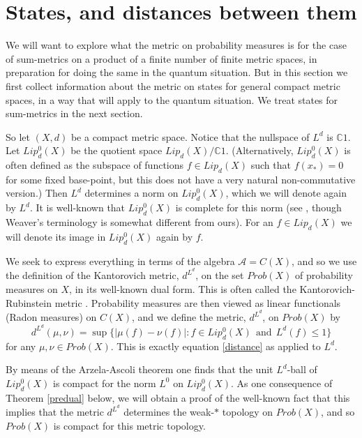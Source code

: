 \documentclass{amsart}[14pt]
\theoremstyle{definition}
\theoremstyle{remark}
\newcommand{\cA}{{\mathcal A}}
\newcommand{\bC}{{\mathbb C}}
\newcommand{\<}{\langle}
\renewcommand{\>}{\rangle}
\numberwithin{equation}{section}
\begin{document}
{ %

\section{States, and distances between them}
\label{trancos}

We will want to explore what the metric on
probability measures is for the
case of sum-metrics on a product of a finite number
of finite metric spaces, in preparation 
for doing the same in the quantum situation. 
But in this section we first collect information about the
metric on states for general compact metric spaces,
in a way that will apply to the quantum situation. We
treat states for sum-metrics in the next section.

So let $(X, d)$ be a compact metric space.
Notice that
the nullspace of $L^d$ is $\bC 1$. Let $Lip^0_d(X)$ be the
quotient space $Lip_d(X)/\bC 1$. 
(Alternatively, $Lip^0_d(X)$ is often defined as the
subspace of functions $f \in Lip_d(X)$ such that $f(x_*) = 0$
for some fixed base-point, but
this does not have a very natural non-commutative version.)
Then $L^d$ determines
a norm on $Lip^0_d(X)$, which we will denote again by $L^d$. 
It is well-known that $Lip^0_d(X)$
is complete for this norm (see \cite{Wvr4}, though Weaver's
terminology is somewhat different from ours). For an $f \in Lip_d(X)$
we will denote its image in $Lip^0_d(X)$ again by $f$.

We seek to express everything in terms of the algebra $\cA=C(X)$,
and so we use the definition of
the Kantorovich metric, $d^{L^d}$, on the set $Prob(X)$ of probability
measures on $X$, in its well-known dual form. This is
often called the Kantorovich-Rubinstein metric \cite{Edw1, Edw2}.
Probability measures are then 
viewed as linear functionals (Radon measures) on $C(X)$,
and we define the metric, $d^{L^d}$, on $Prob(X)$ by
\[
d^{L^d}(\mu, \nu) = \sup \{|\mu(f) - \nu(f)|: 
f \in Lip^0_d(X) \ \ \mathrm{and} \ \   L^d(f) \leq 1\}
\]
for any $\mu, \nu \in Prob(X)$. This is exactly equation
\ref{distance} as applied to $L^d$.

By means of the Arzela-Ascoli theorem one finds 
that the unit $L^d$-ball of $Lip^0_d(X)$ is compact for 
the norm $L^0$ on $Lip^0_d(X)$. 
As one consequence of Theorem \ref{predual} below, we will obtain
a proof of the well-known fact that this implies that the metric $d^{L^d}$
determines the weak-$*$ topology on $Prob(X)$, and so $Prob(X)$ is
compact
for this metric topology. 

}
\end{document}
